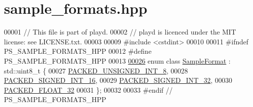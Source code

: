 \hypertarget{sample__formats_8hpp_source}{\section{sample\+\_\+formats.\+hpp}
\label{sample__formats_8hpp_source}
}

\begin{DoxyCode}
00001 \textcolor{comment}{// This file is part of playd.}
00002 \textcolor{comment}{// playd is licenced under the MIT license: see LICENSE.txt.}
00003 
00009 \textcolor{preprocessor}{#include <cstdint>}
00010 
00011 \textcolor{preprocessor}{#ifndef PS\_SAMPLE\_FORMATS\_HPP}
00012 \textcolor{preprocessor}{#define PS\_SAMPLE\_FORMATS\_HPP}
00013 
\hypertarget{sample__formats_8hpp_source_l00026}{}\hyperlink{sample__formats_8hpp_a21cca244e782ff3acc8805fb73236772}{00026} \textcolor{keyword}{enum class} \hyperlink{sample__formats_8hpp_a21cca244e782ff3acc8805fb73236772}{SampleFormat} : std::uint8\_t \{
00027     \hyperlink{sample__formats_8hpp_a21cca244e782ff3acc8805fb73236772a0f083be5e0e503eb0830e26687f00cf2}{PACKED\_UNSIGNED\_INT\_8}, 
00028     \hyperlink{sample__formats_8hpp_a21cca244e782ff3acc8805fb73236772a3bc6c5371607364846832278d3d39965}{PACKED\_SIGNED\_INT\_16},  
00029     \hyperlink{sample__formats_8hpp_a21cca244e782ff3acc8805fb73236772ae222eded89afdf8cf763bb1a58a04fc0}{PACKED\_SIGNED\_INT\_32},  
00030     \hyperlink{sample__formats_8hpp_a21cca244e782ff3acc8805fb73236772ae58d6feb65720ac0b7e1158a2debcf7d}{PACKED\_FLOAT\_32}        
00031 \};
00032 
00033 \textcolor{preprocessor}{#endif // PS\_SAMPLE\_FORMATS\_HPP}
\end{DoxyCode}
